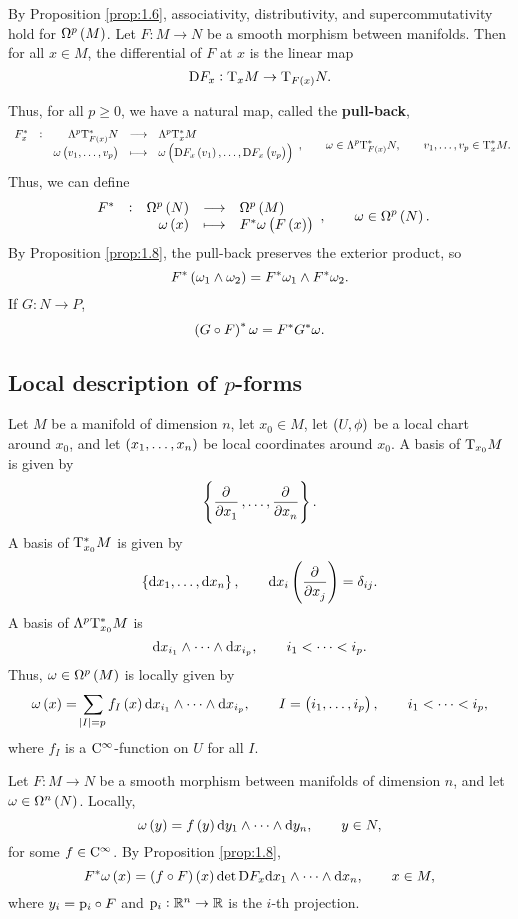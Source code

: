 By Proposition \ref{prop:1.6}, associativity, distributivity, and supercommutativity hold for $ \Omega^p\br{M} $. Let $ F : M \to N $ be a smooth morphism between manifolds. Then for all $ x \in M $, the differential of $ F $ at $ x $ is the linear map
$$ \D F_x : \T_xM \to \T_{F\br{x}}N. $$

\pagebreak

Thus, for all $ p \ge 0 $, we have a natural map, called the \textbf{pull-back},
$$ \function[F_x^*]{\Lambda^p\T_{F\br{x}}^*N}{\Lambda^p\T_x^*M}{\omega\br{v_1, \dots, v_p}}{\omega\br{\D F_x\br{v_1}, \dots, \D F_x\br{v_p}}}, \qquad \omega \in \Lambda^p\T_{F\br{x}}^*N, \qquad v_1, \dots, v_p \in \T_x^*M. $$
Thus, we can define
$$ \function[F^*]{\Omega^p\br{N}}{\Omega^p\br{M}}{\omega\br{x}}{F^*\omega\br{F\br{x}}}, \qquad \omega \in \Omega^p\br{N}. $$
By Proposition \ref{prop:1.8}, the pull-back preserves the exterior product, so
$$ F^*\br{\omega_1 \wedge \omega_2} = F^*\omega_1 \wedge F^*\omega_2. $$
If $ G : N \to P $,
$$ \br{G \circ F}^*\omega = F^*G^*\omega. $$

\subsection{Local description of \texorpdfstring{$ p $}{p}-forms}

Let $ M $ be a manifold of dimension $ n $, let $ x_0 \in M $, let $ \br{U, \phi} $ be a local chart around $ x_0 $, and let $ \br{x_1, \dots, x_n} $ be local coordinates around $ x_0 $. A basis of $ \mathrm{T}_{x_0}M $ is given by
$$ \cbr{\dpd{}{x_1}, \dots, \dpd{}{x_n}}. $$
A basis of $ \mathrm{T}_{x_0}^*M $ is given by
$$ \cbr{\d x_1, \dots, \d x_n}, \qquad \d x_i\br{\dpd{}{x_j}} = \delta_{ij}. $$
A basis of $ \Lambda^p\mathrm{T}_{x_0}^*M $ is
$$ \mathrm{d} x_{i_1} \wedge \dots \wedge \mathrm{d} x_{i_p}, \qquad i_1 < \dots < i_p. $$
Thus, $ \omega \in \Omega^p\br{M} $ is locally given by
$$ \omega\br{x} = \sum_{\abs{I} = p} f_I\br{x} \d x_{i_1} \wedge \dots \wedge \d x_{i_p}, \qquad I = \br{i_1, \dots, i_p}, \qquad i_1 < \dots < i_p, $$
where $ f_I $ is a $ \mathrm{C}^\infty $-function on $ U $ for all $ I $.

\begin{example}
Let $ F : M \to N $ be a smooth morphism between manifolds of dimension $ n $, and let $ \omega \in \Omega^n\br{N} $. Locally,
$$ \omega\br{y} = f\br{y} \d y_1 \wedge \dots \wedge \d y_n, \qquad y \in N, $$
for some $ f \in \mathrm{C}^\infty $. By Proposition \ref{prop:1.8},
$$ F^*\omega\br{x} = \br{f \circ F}\br{x}\det \D F_x \d x_1 \wedge \dots \wedge \d x_n, \qquad x \in M, $$
where $ y_i = \mathrm{p}_i \circ F $ and $ \mathrm{p}_i : \mathbb{R}^n \to \mathbb{R} $ is the $ i $-th projection.
\end{example}


